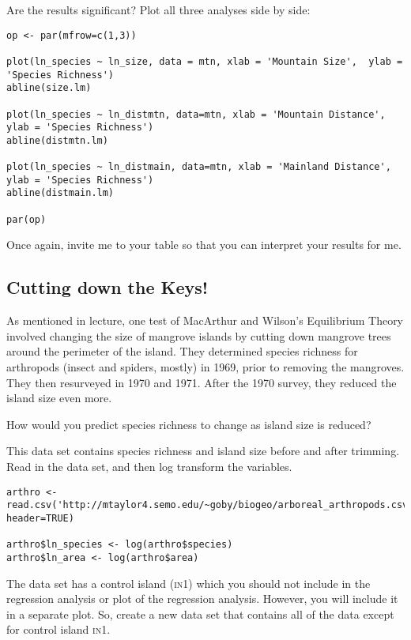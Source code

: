 \documentclass[11pt]{article}
\begin{document}
Are the results significant?  Plot all three analyses side by side:

\begin{verbatim}
op <- par(mfrow=c(1,3))

plot(ln_species ~ ln_size, data = mtn, xlab = 'Mountain Size',  ylab = 'Species Richness')
abline(size.lm)

plot(ln_species ~ ln_distmtn, data=mtn, xlab = 'Mountain Distance', ylab = 'Species Richness')
abline(distmtn.lm)

plot(ln_species ~ ln_distmain, data=mtn, xlab = 'Mainland Distance', ylab = 'Species Richness')
abline(distmain.lm)

par(op)
\end{verbatim}

Once again, invite me to your table so that you can interpret your results for me.

\subsection*{Cutting down the Keys!}

As mentioned in lecture, one test of MacArthur and Wilson's Equilibrium Theory involved changing the size of mangrove islands by cutting down mangrove trees around the perimeter of the island.  They determined species richness for arthropods (insect and spiders, mostly) in 1969, prior to removing the mangroves. They then resurveyed in 1970 and 1971.  After the 1970 survey, they reduced the island size even more. 

How would you predict species richness to change as island size is reduced?

This data set contains species richness and island size before and after trimming.  Read in the data set, and then log transform the variables.

\begin{verbatim}
arthro <- read.csv('http://mtaylor4.semo.edu/~goby/biogeo/arboreal_arthropods.csv', header=TRUE)

arthro$ln_species <- log(arthro$species)
arthro$ln_area <- log(arthro$area)

\end{verbatim}

The data set has a control island (\textsc{in}1) which you should not include in the regression analysis or plot of the regression analysis.  However, you will include it in a separate plot.  So,  create a new data set that contains all of the data except for control island \textsc{in}1.
\end{document}
